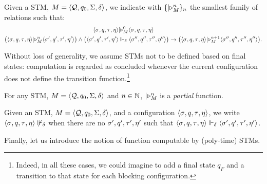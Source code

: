 \begin{defn}\label{df:STMReachability}
Given a STM,
$M=\langle \textcolor{black}{\mathcal{Q}}, \textcolor{black}{q_0}, \textcolor{black}{\Sigma}, \textcolor{black}{\delta}\rangle$,
we indicate with $\{\lvert\triangleright^n_M\}_n$ the smallest
family of relations such that:
%
%
%
\small
\begin{align*}
\langle \m{\sigma}, \m{q}, \m{\tau}, \m{\eta}\rangle
&\stmreach^0_M
\langle \m{\sigma}, \m{q}, \m{\tau}, \m{\eta}\rangle \\
%
%
\big(\langle \m{\sigma}, \m{q}, \m{\tau}, \m{\eta}\rangle
\stmreach^n_M
\langle \m{\sigma'}, \m{q'}, \m{\tau'},\m{\eta'}\rangle\big)
%
\wedge
%
\big(\langle \m{\sigma'}, \m{q'}, \m{\tau'}, \m{\eta'}\rangle
%
&\stmtrans_\delta
%
\langle \m{\sigma''}, \m{q''}, \m{\tau''}, \m{\eta''}\rangle\big)
\rightarrow
\big(\langle \m{\sigma}, \m{q}, \m{\tau}, \m{\eta}\rangle
\stmreach^{n+1}_M
\langle \m{\sigma''}, \m{q''}, \m{\tau''},\m{\eta''}\rangle\big).
\end{align*}
\end{defn}
\normalsize
%
%
%
%
\noindent
Without loss of generality,
we assume STMs not to be defined based on final states:
computation is regarded as concluded
whenever the current configuration does
not define the transition function.\footnote{Indeed,
in all these cases,
we could imagine to add a final state $q_F$
and a transition to that state for each blocking configuration.}


\begin{prop}\label{prop}
For any STM,
$M=\langle \textcolor{black}{\mathcal{Q}}, \textcolor{black}{q_0}, \textcolor{black}{\Sigma},\textcolor{black}{\delta}\rangle$
and $n\in \mathbb{N}$,
$\lvert\triangleright^n_M$ is a \emph{partial} function.
\end{prop}













\begin{notation}
  \label{def:STMFinalConfiguration}
Given an STM,
$M=\langle \textcolor{black}{\mathcal{Q}}, \textcolor{black}{q_0}, \textcolor{black}{\Sigma}, \textcolor{black}{\delta}\rangle$,
and a configuration
$\langle \textcolor{black}{\sigma}, \textcolor{black}{q}, \textcolor{black}{\tau}, \textcolor{black}{\eta}\rangle$,
we write
$\langle \textcolor{black}{\sigma}, \textcolor{black}{q}, \textcolor{black}{\tau}, \textcolor{black}{\eta}\rangle \not\Vdash_{\delta}$
when there are no $\textcolor{black}{\sigma'}, \textcolor{black}{q'}, \textcolor{black}{\tau'}, \textcolor{black}{\eta'}$
such that
$\langle \textcolor{black}{\sigma}, \textcolor{black}{q}, \textcolor{black}{\tau}, \textcolor{black}{\eta}\rangle
\Vdash_{\delta} \langle \textcolor{black}{\sigma'}, \textcolor{black}{q'},
\textcolor{black}{\tau'}, \textcolor{black}{\eta'}\rangle$.
\end{notation}
%
%
%
\noindent
Finally, let us introduce the notion of function computable by (poly-time) STMs.





